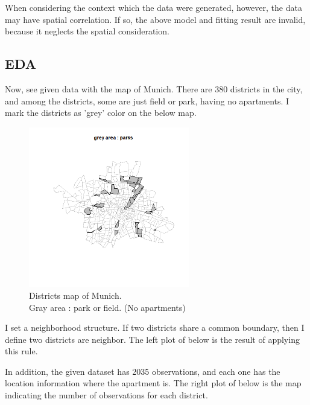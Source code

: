 \documentclass{article}
\begin{document}
When considering the context which the data were generated, however,
the data may have spatial correlation. If so,
the above model and fitting result are invalid, because it neglects the spatial consideration.


\clearpage
\subsection{EDA}
Now, see given data with the map of Munich. There are 380 districts in the city, and
among the districts, some are just field or park, having no apartments. I mark the
districts as 'grey' color on the below map.

\begin{figure}[!h]
    \centering
    \includegraphics[width=7cm]{map_parks.png}
    \caption{Districts map of Munich. \\ Gray area : park or field. (No apartments)}
\end{figure}

I set a neighborhood structure. If two districts share a common boundary,
then I define two districts are neighbor. The left plot of below is the result of applying this rule.

In addition, the given dataset has 2035 observations, and each one has the location information
where the apartment is. The right plot of below is the map indicating the number of observations for each district.
\end{document}
